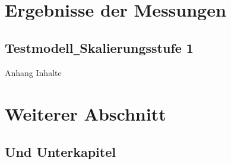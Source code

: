 \label{ch_measurements}

\section{Ergebnisse der Messungen}
\label{measurementResults}
\subsection{Testmodell\texttt{\_}Skalierungsstufe 1}

Anhang Inhalte

\section{Weiterer Abschnitt}
\label{anotherSection}
\subsection{Und Unterkapitel}
